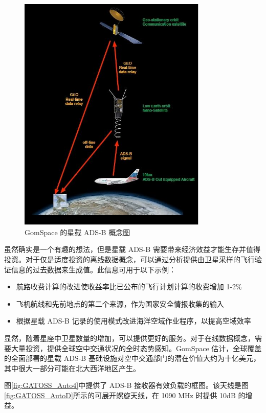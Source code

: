 \begin{figure}[!htb]
\centering
\includegraphics[width=9cm]{pic/GATOSS_Auto5.jpeg}
\caption{GomSpace 的星载 ADS-B 概念图\protect\footnotemark}
\label{fig:GATOSS_Auto5}
\end{figure}


虽然确实是一个有趣的想法，但是星载 ADS-B 需要带来经济效益才能生存并值得投资。对于仅是适度投资的离线数据概念，可以通过分析提供由卫星采样的飞行验证信息的过去数据来生成值。此信息可用于以下示例：

\begin{itemize}
    \item 航路收费计算的改进使收益率比已公布的飞行计划计算的收费增加 1-2\%

    \item 飞机航线和先前地点的第二个来源，作为国家安全情报收集的输入

    \item 根据星载 ADS-B 记录的使用模式改进海洋空域作业程序，以提高空域效率
\end{itemize}

显然，随着星座中卫星数量的增加，可以提供更好的服务。对于在线数据概念，需要大量投资，提供全球空中交通状况的全时态势感知。GomSpace 估计，全球覆盖的全面部署的星载 ADS-B 基础设施对空中交通部门的潜在价值大约为十亿美元，其中很大一部分可能在北大西洋地区产生。

图\ref{fig:GATOSS_Auto4}中提供了 ADS-B 接收器有效负载的框图。该天线是图\ref{fig:GATOSS_AutoD}所示的可展开螺旋天线，在 1090 MHz 时提供 10dB 的增益。

